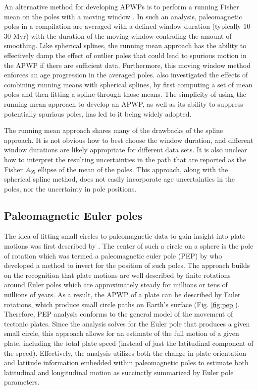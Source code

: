 \documentclass[11pt,letterpaper]{article}
\begin{document}
An alternative method for developing APWPs is to perform a running Fisher mean on the poles with a moving window \citep{Irving1977a, Van-der-Voo2001a, Torsvik2008a}. In such an analysis, paleomagnetic poles in a compilation are averaged with a defined window duration (typically 10-30 Myr) with the duration of the moving window controling the amount of smoothing. Like spherical splines, the running mean approach has the ability to effectively damp the effect of outlier poles that could lead to spurious motion in the APWP if there are sufficient data. Furthermore, this moving window method enforces an age progression in the averaged poles. \cite{Torsvik2008a} also investigated the effects of combining running means with spherical splines, by first computing a set of mean poles and then fitting a spline through those means. The simplicity of using the running mean approach to develop an APWP, as well as its ability to suppress potentially spurious poles, has led to it being widely adopted.

The running mean approach shares many of the drawbacks of the spline approach.  It is not obvious how to best choose the window duration, and different window durations are likely appropriate for different data sets.  It is also unclear how to interpret the resulting uncertainties in the path that are reported as the Fisher $A_{95}$ ellipse of the mean of the poles. This approach, along with the spherical spline method, does not easily incorporate age uncertainties in the poles, nor the uncertainty in pole positions.

\subsection*{Paleomagnetic Euler poles}
The idea of fitting small circles to paleomagnetic data to gain insight into plate motions was first described by \cite{Francheteau1969a}. The center of such a circle on a sphere is the pole of rotation which was termed a paleomagnetic euler pole (PEP) by \cite{Gordon1984a} who developed a method to invert for the position of such poles. The approach builds on the recognition that plate motions are well described by finite rotations around Euler poles which are approximately steady for millions or tens of millions of years. As a result, the APWP of a plate can be described by Euler rotations, which produce small circle paths on Earth's surface (Fig. \ref{fig:pep}). Therefore, PEP analysis conforms to the general model of the movement of tectonic plates. Since the analysis solves for the Euler pole that produces a given small circle, this approach allows for an estimate of the full motion of a given plate, including the total plate speed (instead of just the latitudinal component of the speed). Effectively, the analysis utilizes both the change in plate orientation and latitude information embedded within paleomagnetic poles to estimate both latitudinal and longitudinal motion as succinctly summarized by Euler pole parameters.
\end{document}
